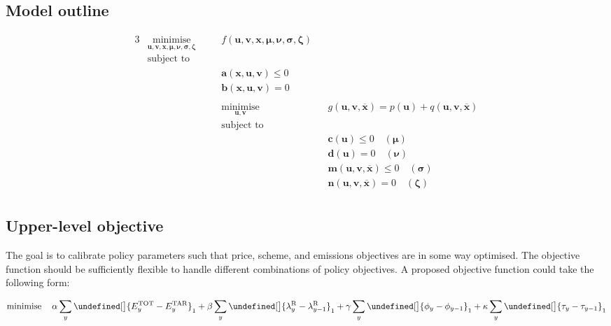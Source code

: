 \documentclass{article}
\newcommand{\iYear}{y}
\newcommand{\vBaseline}[1][\iYear]{\phi_{#1}}
\newcommand{\vPermitPrice}[1][\iYear]{\tau_{#1}}
\newcommand{\vEmissionsTotal}{E^{\mathrm{TOT}}_{\iYear}}
\newcommand{\cEmissionsTarget}{E^{\mathrm{TAR}}_{\iYear}}
\newcommand{\dPriceMetric}[1][\iYear]{\lambda^{\mathrm{R}}_{#1}}
\let\norm\undefined %
\DeclarePairedDelimiter\norm{\lVert}{\rVert}
\DeclareMathOperator*{\minimise}{minimise}
\begin{document}
\subsection{Model outline}
\begin{alignat}{3}
& \minimise\limits_{\bm{u}, \bm{v}, \bm{x}, \bm{\mu}, \bm{\nu}, \bm{\sigma}, \bm{\zeta}} \quad && f\left(\bm{u}, \bm{v}, \bm{x}, \bm{\mu}, \bm{\nu}, \bm{\sigma}, \bm{\zeta}\right) \nonumber\\
& \textrm{subject to} \nonumber\\
& && \bm{a}(\bm{x}, \bm{u}, \bm{v}) \leq 0\\
& && \bm{b}(\bm{x}, \bm{u}, \bm{v}) = 0\\
& \\\nonumber
& && \minimise\limits_{\bm{u}, \bm{v}} \quad && g(\bm{u}, \bm{v}, \bm{\overline{x}}) = p(\bm{u}) + q(\bm{u}, \bm{v}, \bm{\overline{x}}) \nonumber\\
& && \textrm{subject to} \nonumber\\
& && && \bm{c}(\bm{u}) \leq 0 \quad \left(\bm{\mu}\right) \\
& && && \bm{d}(\bm{u}) = 0 \quad \left(\bm{\nu}\right)\\
& && && \bm{m}(\bm{u}, \bm{v}, \bm{\overline{x}}) \leq 0 \quad \left(\bm{\sigma}\right)\\
& && && \bm{n}(\bm{u}, \bm{v}, \bm{\overline{x}}) = 0 \quad \left(\bm{\zeta}\right)\\\nonumber
\end{alignat}

\subsection{Upper-level objective}
The goal is to calibrate policy parameters such that price, scheme, and emissions objectives are in some way optimised. The objective function should be sufficiently flexible to handle different combinations of policy objectives. A proposed objective function could take the following form:

\begin{equation}
	\minimise\limits_{} \quad \alpha \sum\limits_{\iYear} \norm[\big]{\vEmissionsTotal - \cEmissionsTarget}_{1} + \beta \sum\limits_{\iYear} \norm[\big]{\dPriceMetric - \dPriceMetric[\iYear - 1]}_{1} + \gamma \sum\limits_{\iYear} \norm[\big]{\vBaseline -\vBaseline[\iYear-1]}_{1} + \kappa \sum\limits_{\iYear} \norm[\big]{\vPermitPrice - \vPermitPrice[\iYear - 1]}_{1}
\end{equation}
\end{document}

